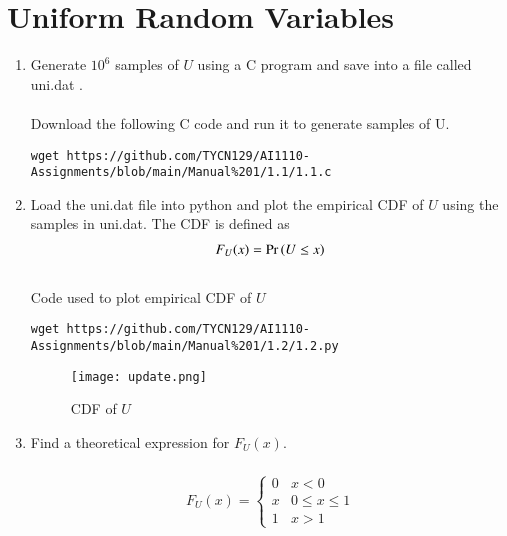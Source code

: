\documentclass[journal,12pt,twocolumn]{IEEEtran}
\renewcommand\thesection{\arabic{section}}
\begin{document}
\section{Uniform Random Variables}
\begin{enumerate}[label=\thesection.\arabic*
,ref=\thesection.\theenumi]
\item Generate $10^6$ samples of $U$ using a C program and save into a file called uni.dat .
\\
\solution\\ 
Download the following C code and run it to generate samples of U.
\begin{lstlisting}
wget https://github.com/TYCN129/AI1110-Assignments/blob/main/Manual%201/1.1/1.1.c
\end{lstlisting}
\item Load the uni.dat file into python and plot the empirical CDF of $U$ using the samples in uni.dat. The CDF is defined as
\begin{align}
F_{U}(x) = \Pr\left(U \le x\right)
\end{align}
\\
\solution
Code used to plot empirical CDF of $U$
\begin{lstlisting}
wget https://github.com/TYCN129/AI1110-Assignments/blob/main/Manual%201/1.2/1.2.py
\end{lstlisting}
\begin{figure}[H]
    \texttt{[image: update.png]}
    \caption{CDF of $U$}
    \label{fig:my_label}
\end{figure}
\item Find a  theoretical expression for $F_{U}(x)$.\\
\solution\\
\begin{align}
    \displaystyle F_U(x) = \begin{cases} 
    0 & \text{$x < 0$} \\  
    x & \text{$0 \leq x \leq 1$} \\  
    1 & \text{$x > 1$}  
    \end{cases}
\end{align}


\end{enumerate}
\end{document}
